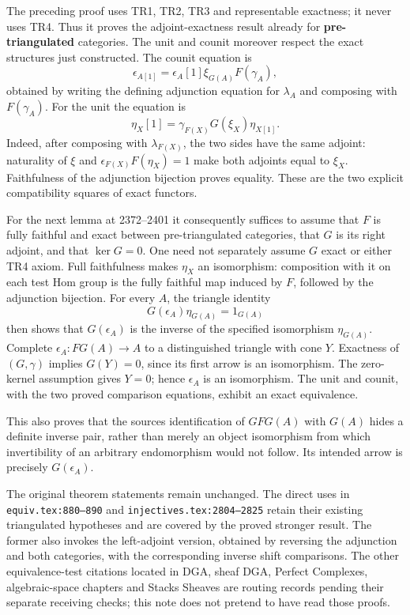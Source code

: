 The preceding proof uses TR1,\allowbreak{} TR2,\allowbreak{} TR3 and representable exactness; it never uses TR4. Thus it proves the adjoint-exactness result already for \textbf{pre-triangulated} categories. The unit and counit moreover respect the exact structures just constructed. The counit equation is \[
\epsilon_{A[1]}=\epsilon_A[1]\xi_{G(A)}F(\gamma_A),
\] obtained by writing the defining adjunction equation for \(\lambda_A\) and composing with \(F(\gamma_A)\). For the unit the equation is \[
\eta_X[1]=\gamma_{F(X)}G(\xi_X)\eta_{X[1]}.
\] Indeed,\allowbreak{} after composing with \(\lambda_{F(X)}\),\allowbreak{} the two sides have the same adjoint:\allowbreak{} naturality of \(\xi\) and \(\epsilon_{F(X)}F(\eta_X)=1\) make both adjoints equal to \(\xi_X\). Faithfulness of the adjunction bijection proves equality. These are the two explicit compatibility squares of exact functors.

For the next lemma at 2372–\allowbreak{}2401 it consequently suffices to assume that \(F\) is fully faithful and exact between pre-triangulated categories,\allowbreak{} that \(G\) is its right adjoint,\allowbreak{} and that \(\ker G=0\). One need not separately assume \(G\) exact or either TR4 axiom. Full faithfulness makes \(\eta_X\) an isomorphism:\allowbreak{} composition with it on each test Hom group is the fully faithful map induced by \(F\),\allowbreak{} followed by the adjunction bijection. For every \(A\),\allowbreak{} the triangle identity \[
G(\epsilon_A)\eta_{G(A)}=1_{G(A)}
\] then shows that \(G(\epsilon_A)\) is the inverse of the specified isomorphism \(\eta_{G(A)}\). Complete \(\epsilon_A:FG(A)\to A\) to a distinguished triangle with cone \(Y\). Exactness of \((G,\gamma)\) implies \(G(Y)=0\),\allowbreak{} since its first arrow is an isomorphism. The zero-kernel assumption gives \(Y=0\); hence \(\epsilon_A\) is an isomorphism. The unit and counit,\allowbreak{} with the two proved comparison equations,\allowbreak{} exhibit an exact equivalence.

This also proves that the source\textquotesingle s identification of \(GFG(A)\) with \(G(A)\) hides a definite inverse pair,\allowbreak{} rather than merely an object isomorphism from which invertibility of an arbitrary endomorphism would not follow. Its intended arrow is precisely \(G(\epsilon_A)\).

The original theorem statements remain unchanged. The direct uses in \texttt{equiv.\allowbreak{}tex:\allowbreak{}880–\allowbreak{}890} and \texttt{injectives.\allowbreak{}tex:\allowbreak{}2804–\allowbreak{}2825} retain their existing triangulated hypotheses and are covered by the proved stronger result. The former also invokes the left-adjoint version,\allowbreak{} obtained by reversing the adjunction and both categories,\allowbreak{} with the corresponding inverse shift comparisons. The other equivalence-test citations located in DGA,\allowbreak{} sheaf DGA,\allowbreak{} Perfect Complexes,\allowbreak{} algebraic-space chapters and Stacks Sheaves are routing records pending their separate receiving checks; this note does not pretend to have read those proofs.
